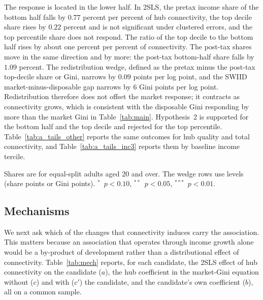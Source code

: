 \documentclass[12pt]{article}
\newcommand{\sym}[1]{\ensuremath{^{#1}}}
\begin{document}
The response is located in the lower half. In 2SLS, the pretax income share of the bottom half falls by $0.77$ percent per percent of hub connectivity, the top decile share rises by $0.22$ percent and is not significant under clustered errors, and the top percentile share does not respond. The ratio of the top decile to the bottom half rises by about one percent per percent of connectivity. The post-tax shares move in the same direction and by more: the post-tax bottom-half share falls by $1.09$ percent. The redistribution wedge, defined as the pretax minus the post-tax top-decile share or Gini, narrows by $0.09$ points per log point, and the SWIID market-minus-disposable gap narrows by $6$ Gini points per log point. Redistribution therefore does not offset the market response; it contracts as connectivity grows, which is consistent with the disposable Gini responding by more than the market Gini in Table~\ref{tab:main}. Hypothesis~2 is supported for the bottom half and the top decile and rejected for the top percentile. Table~\ref{tab:a_tails_other} reports the same outcomes for hub quality and total connectivity, and Table~\ref{tab:a_tails_inc3} reports them by baseline income tercile.

\begin{table}[H]\centering\caption{Distributional location: WID income shares and the redistribution wedge (hub connectivity, Feyrer instrument).}\label{tab:tails}
\begin{threeparttable}\small
\begin{tablenotes}\footnotesize\item Shares are for equal-split adults aged 20 and over. The wedge rows use levels (share points or Gini points). \sym{*}~$p<0.10$, \sym{**}~$p<0.05$, \sym{***}~$p<0.01$.\end{tablenotes}\end{threeparttable}\end{table}

\subsection{Mechanisms}
\label{sec:mech}
We next ask which of the changes that connectivity induces carry the association. This matters because an association that operates through income growth alone would be a by-product of development rather than a distributional effect of connectivity. Table~\ref{tab:mech} reports, for each candidate, the 2SLS effect of hub connectivity on the candidate ($a$), the hub coefficient in the market-Gini equation without ($c$) and with ($c'$) the candidate, and the candidate's own coefficient ($b$), all on a common sample.
\end{document}
